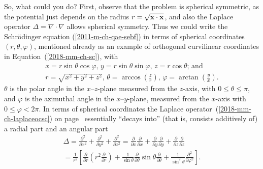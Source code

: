 So, what could you do?
First, observe that the problem is spherical symmetric,
as the potential   just depends on the radius $r=\sqrt{{\bf x}\cdot {\bf x}}$,
and also the Laplace operator $\Delta =
\nabla \cdot \nabla $ allows spherical symmetry.
Thus we could write   the Schr\"odinger equation (\ref{2011-m-ch-qae-sebf})
in terms of spherical coordinates
$(r, \theta ,\varphi )$,
mentioned already as an example of orthogonal curvilinear coordinates in Equation~(\ref{2018-mm-ch-sc}),
with
\begin{equation}
\begin{split}
x  = r\sin \theta \cos \varphi \text{, }
y = r\sin \theta \sin \varphi \text{, }
z = r\cos \theta  \text{; and}\\
r=\sqrt{x^2+y^2+z^2}\text{, }
\theta = \arccos \left(\frac{z}{r}\right)\text{, }
\varphi=  \arctan \left(\frac{y}{x}\right).
\end{split}
\label{2018-mm-ch-sc1}
\end{equation}
$\theta$ is the polar angle in the $x$--$z$-plane measured
from the $z$-axis, with $0 \le \theta \le \pi$,
and $\varphi $ is  the azimuthal angle in the $x$--$y$-plane, measured
from the $x$-axis with $0 \le \varphi < 2 \pi$.
In terms of spherical coordinates the Laplace operator~(\ref{2018-mm-ch-laplaceocsc})
on page~\pageref{2018-mm-ch-laplaceocsc}
essentially ``decays into'' (that is, consists additively of)
a radial part and an angular part
\begin{equation}
\begin{split}
\Delta =
 \frac{\partial^2}{\partial x^2}
+
\frac{\partial^2}{\partial y^2}
+
\frac{\partial^2}{\partial z^2}
=
 \frac{\partial}{\partial x}
 \frac{\partial}{\partial x}
+
\frac{\partial}{\partial y}
 \frac{\partial}{\partial y}
+
\frac{\partial}{\partial z}
 \frac{\partial}{\partial z}
\\
=
\frac{1}{r^2} \left[ \frac{\partial}{\partial r}\left( r^2\frac{\partial}{\partial r}\right)
+
\frac{1}{\sin \theta}   \frac{\partial}{\partial \theta }
\sin \theta \frac{\partial}{\partial \theta }
+
\frac{1}{\sin^2 \theta} \frac{\partial^2}{\partial \varphi^2 }
\right].
\end{split}
\label{2011-m-ch-qae-losc}
\end{equation}


